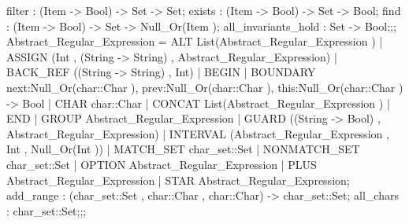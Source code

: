 {{{{                                        filter : (Item -> Bool) -> Set -> Set;
                                        exists : (Item -> Bool) -> Set -> Bool;
                                        find : (Item -> Bool) -> Set -> Null_Or(Item );
                                        all_invariants_hold : Set -> Bool;};;
                                Abstract_Regular_Expression
                                = ALT
                                List(Abstract_Regular_Expression )
                                |
                                ASSIGN
                                (Int , (String -> String) , Abstract_Regular_Expression)
                                |
                                BACK_REF
                                ((String -> String) , Int)
                                |
                                BEGIN
                                |
                                BOUNDARY
                                {next:Null_Or(char::Char ), prev:Null_Or(char::Char ), this:Null_Or(char::Char )} -> Bool
                                |
                                CHAR
                                char::Char
                                |
                                CONCAT
                                List(Abstract_Regular_Expression )
                                |
                                END
                                |
                                GROUP
                                Abstract_Regular_Expression
                                |
                                GUARD
                                ((String -> Bool) , Abstract_Regular_Expression)
                                |
                                INTERVAL
                                (Abstract_Regular_Expression , Int , Null_Or(Int ))
                                |
                                MATCH_SET
                                char_set::Set
                                |
                                NONMATCH_SET
                                char_set::Set
                                |
                                OPTION
                                Abstract_Regular_Expression
                                |
                                PLUS
                                Abstract_Regular_Expression
                                |
                                STAR
                                Abstract_Regular_Expression;
                            add_range : (char_set::Set , char::Char , char::Char) -> char_set::Set;
                            all_chars : char_set::Set;};;
}}
